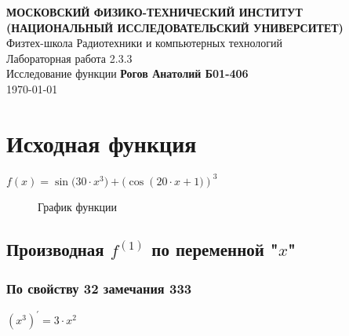\documentclass[12pt, letterpaper]{report}
\begin{document}
\begin{titlepage}
\begin{center}
\vspace*{1cm}
\textbf{МОСКОВСКИЙ ФИЗИКО-ТЕХНИЧЕСКИЙ ИНСТИТУТ (НАЦИОНАЛЬНЫЙ ИССЛЕДОВАТЕЛЬСКИЙ УНИВЕРСИТЕТ)}\\
\vspace{0.5cm} Физтех-школа Радиотехники и компьютерных технологий\\
\vspace{5cm} \LARGE{Лабораторная работа 2.3.3\\
Исследование функции}
\vfill
\large{\textbf{Рогов Анатолий Б01-406}} \\
\large \today
\vspace{0.8cm}
\end{center}
\end{titlepage}
\chapter{Исходная функция}
\hfil $f(x) = {\sin({{30}\cdot{{x}^{3}})}}+{{(\cos({{{20}\cdot{x}}+{1})})}^{3}}$\\
\begin{figure}[h]
\centering
{}
\caption{График функции}
\end{figure}
\section{Производная $f^{(1)}$ по переменной "$x$"}
\renewcommand{\thesubsection}{\arabic{subsection}}
\titleformat{\subsection}{\normalfont\bfseries}{}{0em}{\thesubsection\ #1 }
\subsection{По свойству 32 замечания 333}
\begin{center} $({x}^{3})^{\prime} = {3}\cdot{{x}^{2}}$ \end{center} 
\end{document}

